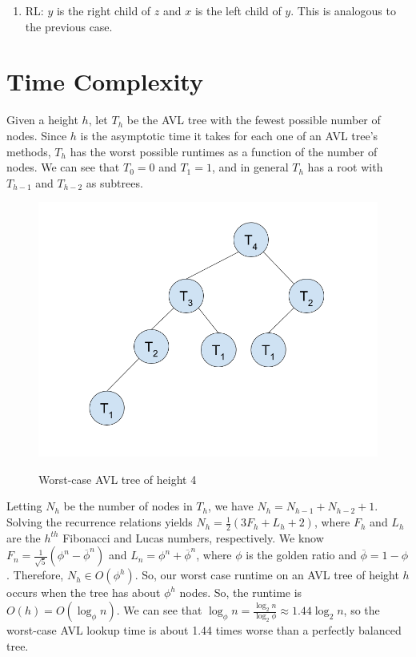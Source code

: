 \documentclass[12pt]{article}
\begin{document}
\begin{enumerate}
  \item RL: $y$ is the right child of $z$ and $x$ is the left child of $y$. This is analogous to the previous case.

\end{enumerate}

\section*{Time Complexity}
Given a height $h$, let $T_h$ be the AVL tree with the fewest possible number of nodes. Since $h$ is the asymptotic time it takes for each one of an AVL tree's methods, $T_h$ has the worst possible runtimes as a function of the number of nodes. We can see that $T_0 = 0$ and $T_1 = 1$, and in general $T_h$ has a root with $T_{h-1}$ and $T_{h-2}$ as subtrees.
\begin{figure}[h]
  \centering
  \includegraphics[scale=0.5]{pics/avl_tree/time_comp} \\
  \caption{Worst-case AVL tree of height 4}
\end{figure}

Letting $N_h$ be the number of nodes in $T_h$, we have $N_h = N_{h-1} + N_{h-2} + 1$. Solving the recurrence relations yields $N_h = \frac{1}{2}\left(3F_h + L_h + 2\right)$, where $F_h$ and $L_h$ are the $h^{th}$ Fibonacci and Lucas numbers, respectively. We know $F_n = \frac{1}{\sqrt{5}}\left( \phi^n - \overline{\phi}^n \right)$ and $L_n = \phi^n + \overline{\phi}^n $, where $\phi$ is the golden ratio and $\overline{\phi} = 1 - \phi$. Therefore, $N_h \in O(\phi^h)$. So, our worst case runtime on an AVL tree of height $h$ occurs when the tree has about $\phi^h$ nodes. So, the runtime is $O(h) = O(\log_{\phi}n)$.
We can see that $\log_{\phi}n = \frac{\log_2 n}{\log_2 \phi} \approx 1.44 \log_2 n$, so the worst-case AVL lookup time is about 1.44 times worse than a perfectly balanced tree.
\end{document}
